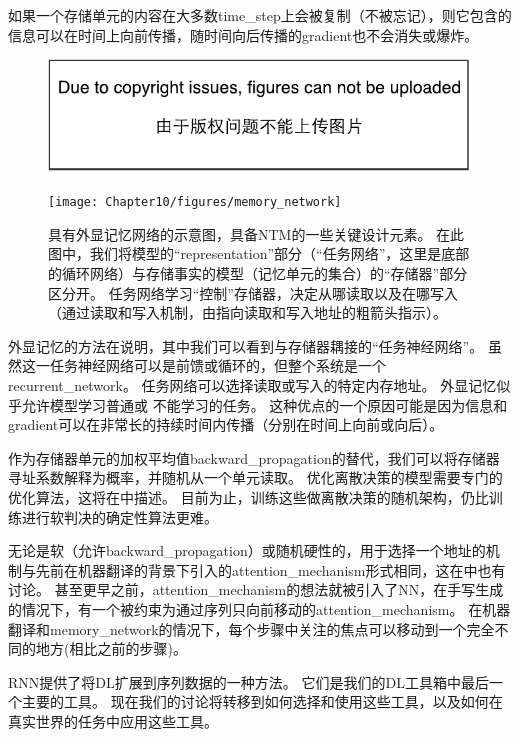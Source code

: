如果一个存储单元的内容在大多数\gls{time_step}上会被复制（不被忘记），则它包含的信息可以在时间上向前传播，随时间向后传播的\gls{gradient}也不会消失或爆炸。

\begin{figure}[!htb]
\ifOpenSource
\centerline{\includegraphics{figure.pdf}}
\else
\centerline{\texttt{[image: Chapter10/figures/memory\_network]}}
\fi
\caption{具有外显记忆网络的示意图，具备\gls{NTM}的一些关键设计元素。
在此图中，我们将模型的``\gls{representation}''部分（``任务网络''，这里是底部的循环网络）与存储事实的模型（记忆单元的集合）的``存储器''部分区分开。
任务网络学习``控制''存储器，决定从哪读取以及在哪写入（通过读取和写入机制，由指向读取和写入地址的粗箭头指示）。
}
\label{fig:chap10_memory_network}
\end{figure}

外显记忆的方法在说明，其中我们可以看到与存储器耦接的``任务神经网络''。
虽然这一任务神经网络可以是前馈或循环的，但整个系统是一个\gls{recurrent_network}。
任务网络可以选择读取或写入的特定内存地址。
外显记忆似乎允许模型学习普通或 不能学习的任务。
这种优点的一个原因可能是因为信息和\gls{gradient}可以在非常长的持续时间内传播（分别在时间上向前或向后）。


作为存储器单元的加权平均值\gls{backward_propagation}的替代，我们可以将存储器寻址系数解释为概率，并随机从一个单元读取\citep{Zaremba+Sutskever-arxiv2015}。
优化离散决策的模型需要专门的优化算法，这将在中描述。
目前为止，训练这些做离散决策的随机架构，仍比训练进行软判决的确定性算法更难。

无论是软（允许\gls{backward_propagation}）或随机硬性的，用于选择一个地址的机制与先前在机器翻译的背景下引入的\gls{attention_mechanism}形式相同\citep{Bahdanau-et-al-ICLR2015-small}，这在中也有讨论。
甚至更早之前，\gls{attention_mechanism}的想法就被引入了\gls{NN}，在手写生成的情况下\citep{Graves-arxiv2013}，有一个被约束为通过序列只向前移动的\gls{attention_mechanism}。
在机器翻译和\gls{memory_network}的情况下，每个步骤中关注的焦点可以移动到一个完全不同的地方(相比之前的步骤)。

\gls{RNN}提供了将\gls{DL}扩展到序列数据的一种方法。
它们是我们的\gls{DL}工具箱中最后一个主要的工具。
现在我们的讨论将转移到如何选择和使用这些工具，以及如何在真实世界的任务中应用这些工具。
